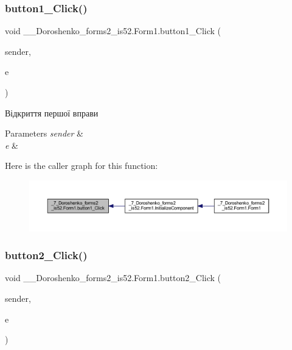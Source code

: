 \subsubsection{\texorpdfstring{button1\+\_\+\+Click()}{button1\_Click()}}
{\footnotesize\ttfamily void \+\_\+\_\+\+Doroshenko\+\_\+forms2\+\_\+is52.\+Form1.\+button1\+\_\+\+Click (\begin{DoxyParamCaption}\item[{object}]{sender,  }\item[{Event\+Args}]{e }\end{DoxyParamCaption})\hspace{0.3cm}{\ttfamily [private]}}



Відкриття першої вправи 


\begin{DoxyParams}{Parameters}
{\em sender} & \\
\hline
{\em e} & \\
\hline
\end{DoxyParams}
Here is the caller graph for this function\+:
\nopagebreak
\begin{figure}[H]
\begin{center}
\leavevmode
\includegraphics[width=350pt]{class__7___doroshenko__forms2__is52_1_1_form1_a607baff215aa451ab201b1afe65c9669_icgraph}
\end{center}
\end{figure}
\hypertarget{class__7___doroshenko__forms2__is52_1_1_form1_a396c65df583a69ba0692af2fb86ea43b}{}\label{class__7___doroshenko__forms2__is52_1_1_form1_a396c65df583a69ba0692af2fb86ea43b} 
\subsubsection{\texorpdfstring{button2\+\_\+\+Click()}{button2\_Click()}}
{\footnotesize\ttfamily void \+\_\+\_\+\+Doroshenko\+\_\+forms2\+\_\+is52.\+Form1.\+button2\+\_\+\+Click (\begin{DoxyParamCaption}\item[{object}]{sender,  }\item[{Event\+Args}]{e }\end{DoxyParamCaption})\hspace{0.3cm}{\ttfamily [private]}}



